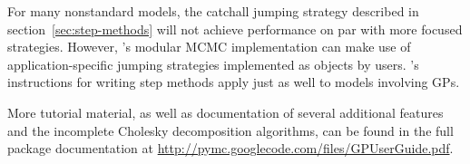 \documentclass[article]{jss}
\begin{document}
For many nonstandard models, the catchall jumping strategy described in section~\ref{sec:step-methods} will not achieve performance on par with more focused strategies. However, 's modular MCMC implementation can make use of application-specific jumping strategies implemented as  objects by users. \cite{pymc}'s instructions for writing step methods apply just as well to models involving GPs.

More tutorial material, as well as documentation of several additional features and the incomplete Cholesky decomposition algorithms, can be found in the full package documentation at \href{http://pymc.googlecode.com/files/GPUserGuide.pdf}{http://pymc.googlecode.com/files/GPUserGuide.pdf}.


\end{document}
